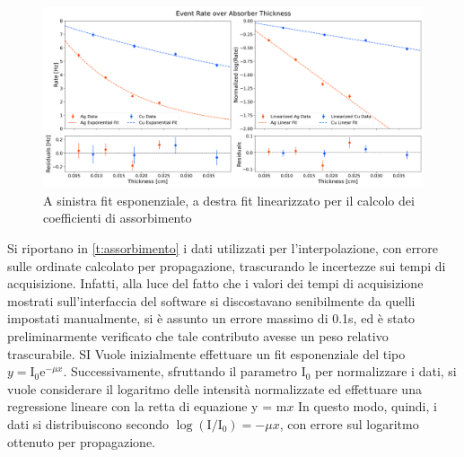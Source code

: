 \documentclass[twocolumn,10pt]{asme2ej}
\begin{document}
\begin{figure}[t]
    \centering
    \includegraphics[width=\textwidth]{../Plots/attenuation_coeff.png}
   \caption{A sinistra fit esponenziale, a destra fit linearizzato per il calcolo dei coefficienti di assorbimento}
    \label{i:attenuation}
\end{figure}

Si riportano in \autoref{t:assorbimento} i dati utilizzati per l'interpolazione, con errore sulle ordinate calcolato per 
propagazione, trascurando le incertezze sui tempi di acquisizione. Infatti, alla luce del fatto che i valori dei tempi di
acquisizione mostrati sull'interfaccia del software si discostavano senibilmente da quelli impostati manualmente, si è 
assunto un errore massimo di 0.1\si{\second}, ed è stato preliminarmente verificato che tale contributo avesse un peso 
relativo trascurabile. SI Vuole inizialmente effettuare un fit esponenziale del tipo $y = \text{I}_0 \text{e}^{-\mu x }$. 
Successivamente, sfruttando il parametro $\text{I}_0 $ per normalizzare i dati, si vuole considerare il logaritmo delle 
intensità normalizzate ed effettuare una regressione lineare con la retta  di equazione y = m$x$  In questo modo, quindi, 
i dati si distribuiscono secondo $\log(\text{I}/\text{I}_0)=-\mu x$, con errore sul logaritmo ottenuto per propagazione. 
\end{document}
